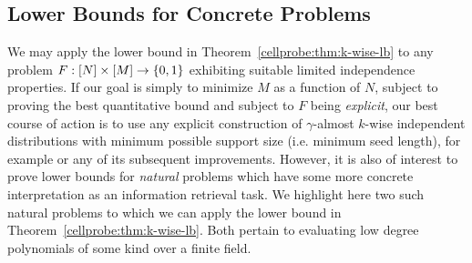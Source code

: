 \subsection{Lower Bounds for Concrete Problems}
We may apply the lower bound in Theorem~\ref{cellprobe:thm:k-wise-lb} to any problem $F: [N] \times [M] \to \{0,1\}$ exhibiting suitable limited independence properties. If our goal is simply to minimize $M$ as a function of $N$, subject to proving the best quantitative bound and subject to $F$ being \emph{explicit}, our best course of action is to use any explicit construction of $\gamma$-almost $k$-wise independent distributions with minimum possible support size (i.e. minimum seed length), for example \cite{naornaor} or any of its subsequent improvements. However, it is also of interest to prove lower bounds for \emph{natural} problems which have some more concrete interpretation as an information retrieval task. 
We highlight here two such natural problems to which we can apply the lower bound in Theorem~\ref{cellprobe:thm:k-wise-lb}. Both pertain to evaluating low degree polynomials of some kind over a finite field.
